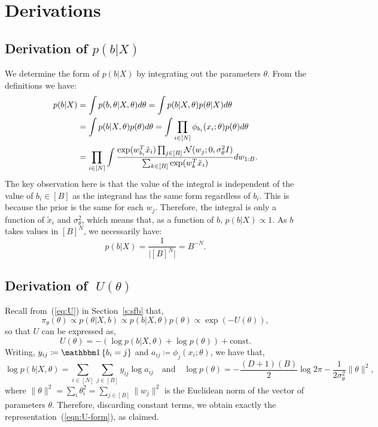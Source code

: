 \section{Derivations}

\subsection{Derivation of {\boldmath $p(b|X)$}}
\label{appdx:b|x}

We determine the form of $p(b| X)$ by integrating
out the parameters $\theta$. From the definitions we have:
%
\begin{align*}
	p(b | X) &= \int p(b , \theta| X, \theta) d\theta = \int p(b | X, \theta) p(\theta | X) d\theta \\
	&=\int p(b | X, \theta) p(\theta) d\theta = \int \prod_{i \in [N] } \phi_{b_i}(x_i; \theta) p(\theta) d\theta \\
	&= \prod_{i \in [N]} \int \frac{\exp(w_{b_i}^T \tilde{x}_i) \prod_{j \in [B]} \mathcal{N}(w_j; 0, \sigma_\theta^2 I)}{\sum_{k \in [B]} \exp(w_{k}^T \tilde{x}_i)} dw_{1:B}.
\end{align*}
%
The key observation here is that 
the value of the integral is independent
of the value of $b_i \in [B]$ as
the integrand has the same form regardless of $b_i$. This is
because the prior is the same for each $w_j$. 
Therefore, the integral is only a function of $\tilde{x}_i$ and $\sigma_\theta^2$,
which means that, as a function of $b$, $p(b|X)\propto 1$. As
$b$ takes values in $[B]^N$, we necessarily have:
%
\begin{equation}
	p(b | X) = \frac{1}{\big|[B]^N\big|}=B^{-N}.
\end{equation}

\subsection{Derivation of {\boldmath $\;U(\theta)$}}
\label{appdx:form-U}

Recall from~(\ref{eq:U}) in Section~\ref{s:sfb} that,
$$	\pi_\theta(\theta) \propto p(\theta | X, b) \propto p(b | X, \theta) p(\theta) \propto  \exp \left( - U(\theta) \right),
$$ 
so that $U$ can be expressed as,
$$
U(\theta) 
= - \left( \log p(b | X, \theta) + \log p(\theta) \right) + \textrm{const}.
$$
Writing,
$y_{ij} \coloneqq \one \left\{ b_i = j \right\}$ and 
$a_{ij} \coloneqq \phi_j(x_i; \theta)$, we have that,
%
\begin{equation}
	\log p(b | X, \theta) = \sum_{i \in [N]} \sum_{j \in [B]} y_{ij} \log a_{ij}  \quad \textrm{and} \quad
	\log p(\theta) = -\frac{(D+1)(B)}{2} \log 2\pi - \frac{1}{2 \sigma_\theta^2} 
	\|\theta \|^2,
	\label{eqn:U-constituent-terms}
\end{equation}
%
where
$\|\theta\|^2 = \sum_{i} \theta_{i}^2 = \sum_{j \in [B]} \|w_j\|^2$ 
is the Euclidean norm of the vector of parameters $\theta$.
Therefore, discarding constant terms, we 
obtain exactly the representation~(\ref{eqn:U-form}), as claimed.

